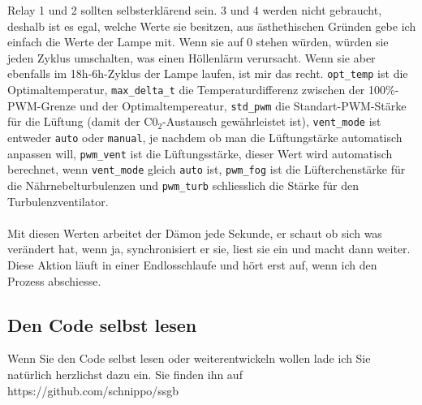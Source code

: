 \documentclass[12pt,titlepage,a4paper]{article}
\begin{document}
Relay 1 und 2 sollten selbsterklärend sein. 3 und 4 werden nicht gebraucht, deshalb ist es egal, welche Werte sie besitzen, aus ästhethischen Gründen gebe ich einfach die Werte der Lampe mit. Wenn sie auf 0 stehen würden, würden sie jeden Zyklus umschalten, was einen Höllenlärm verursacht. Wenn sie aber ebenfalls im 18h-6h-Zyklus der Lampe laufen, ist mir das recht. \verb^opt_temp^ ist die Optimaltemperatur, \verb^max_delta_t^ die Temperaturdifferenz zwischen der 100\%-PWM-Grenze und der Optimaltempereatur, \verb^std_pwm^ die Standart-PWM-Stärke für die Lüftung (damit der C0$ _{2} $-Austausch gewährleistet ist), \verb^vent_mode^ ist entweder \verb^auto^ oder \verb^manual^, je nachdem ob man die Lüftungstärke automatisch anpassen will, \verb^pwm_vent^ ist die Lüftungsstärke, dieser Wert wird automatisch berechnet, wenn \verb^vent_mode^ gleich \verb^auto^ ist, \verb^pwm_fog^ ist die Lüfterchenstärke für die Nährnebelturbulenzen und \verb^pwm_turb^ schliesslich die Stärke für den Turbulenzventilator.\\ \\Mit diesen Werten arbeitet der Dämon jede Sekunde, er schaut ob sich was verändert hat, wenn ja, synchronisiert er sie, liest sie ein und macht dann weiter. Diese Aktion läuft in einer Endlosschlaufe und hört erst auf, wenn ich den Prozess abschiesse.

\subsection{Den Code selbst lesen}
Wenn Sie den Code selbst lesen oder weiterentwickeln wollen lade ich Sie natürlich herzlichst dazu ein. Sie finden ihn auf https://github.com/schnippo/ssgb
\end{document}
